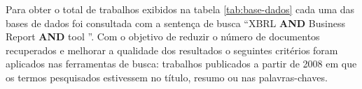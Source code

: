 \documentclass[12pt]{article}
\begin{document}
\begin{table}[ht]
\centering
{}
\caption{Base de dados e número de artigos}
\label{tab:base-dados}
\end{table}

Para obter o total de trabalhos exibidos na tabela \ref{tab:base-dados} cada
uma das bases de dados foi consultada com a sentença de busca ``XBRL \textbf{AND} Business Report \textbf{AND} tool
''. Com o objetivo de reduzir o número de documentos recuperados e melhorar a
qualidade dos resultados o seguintes critérios foram aplicados nas ferramentas
de busca: trabalhos publicados a partir de 2008 em que os termos pesquisados
estivessem no título, resumo ou nas palavras-chaves.
\end{document}
